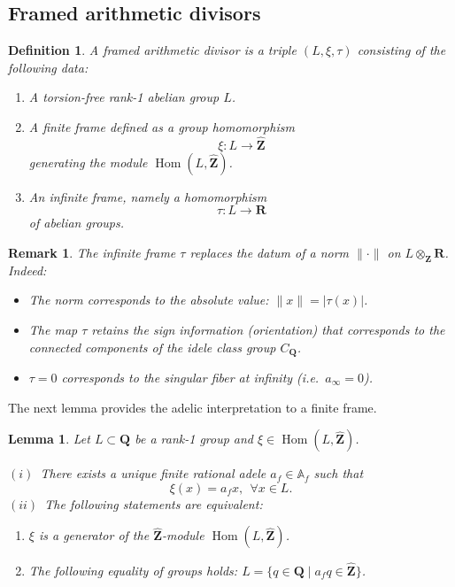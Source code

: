 \documentclass[11pt,a4paper]{article}
\newcommand{\Q}{\mathbf{Q}}
\newcommand{\Z}{\mathbf{Z}}
\newcommand{\R}{\mathbf{R}}
\newcommand{\A}{\mathbb{A}}
\def\ie{{\it i.e.\/}\ }
\theoremstyle{plain}
\newtheorem{defn}[thm]{Definition}
\newtheorem{lem}[thm]{Lemma}
\newtheorem{rem}[thm]{Remark}
\theoremstyle{definition} %
\begin{document}
\subsection{Framed arithmetic divisors}



\begin{defn}
A \emph{framed arithmetic divisor} is a triple $(L, \xi, \tau)$ consisting of the following data:
\begin{enumerate}
    \item A torsion-free rank-1 abelian group $L$.
    \item A \emph{finite frame} defined as a group homomorphism $$\xi: L \to \widehat{\Z}$$ generating the module $\operatorname{Hom}(L, \widehat{\Z})$.
    \item An \emph{infinite frame}, namely a homomorphism $$\tau: L \to \R$$ of abelian groups.
\end{enumerate}
\end{defn}

\begin{rem}
The infinite frame $\tau$ replaces the datum of a norm $\|\cdot\|$ on $L\otimes_\Z\R$. Indeed:
\begin{itemize}[leftmargin=*, labelindent=0pt]
    \item[] The norm corresponds to the absolute value: $\|x\| = |\tau(x)|$.
    \item[] The map $\tau$ retains the \emph{sign}  information (orientation) that corresponds to the connected components of the idele class group $C_\Q$.
    \item[] $\tau = 0$ corresponds to the singular fiber at infinity (\ie $a_\infty = 0$).
\end{itemize}
\end{rem}

The next lemma provides the adelic interpretation to a finite frame.

\begin{lem}\label{tight}
Let $L\subset \Q$ be a rank-1 group and $\xi \in \operatorname{Hom}(L, \widehat{\Z})$.\vspace{.03in}

$(i)$~There exists a unique finite rational adele $a_f\in \A_f$ such that 
$$
\xi(x)=a_f x, \ \ \forall x\in L.
$$
$(ii)$~The following statements are equivalent:
\begin{enumerate}
    \item $\xi$ is a generator of the $\widehat{\Z}$-module $\operatorname{Hom}(L, \widehat{\Z})$.
    \item The following equality of groups holds: $L=\{q\in \Q\mid a_f q\in \widehat{\Z}\}$.
\end{enumerate}
\end{lem}
\end{document}
